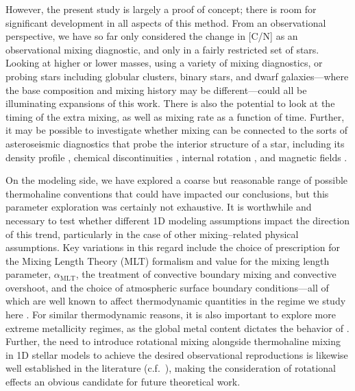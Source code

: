 However, the present study is largely a proof of concept;
there is room for significant development in all aspects of this method. From an observational perspective, we have so far only considered the change in [C/N] as an observational mixing diagnostic, and only in a fairly restricted set of stars. Looking at higher or lower masses, using a variety of mixing diagnostics, or probing stars including globular clusters, binary stars, and dwarf galaxies---where the base composition and mixing history may be different---could all be illuminating expansions of this work. There is also the potential to look at the timing of the extra mixing, as well as mixing rate as a function of time. Further, it may be possible to investigate whether mixing can be connected to the sorts of asteroseismic diagnostics that probe the interior structure of a star, including its density profile \citep{KjeldsenBedding1995}, chemical discontinuities \citep{Verma2017}, internal rotation \citep{Gehan2018}, and magnetic fields \citep{Bugnet2021}. 

On the modeling side, we have explored a coarse but reasonable range of possible thermohaline conventions that could have impacted our conclusions, but this parameter exploration was certainly not exhaustive. It is worthwhile and necessary to test whether different 1D modeling assumptions impact the direction of this trend, particularly in the case of other mixing--related physical assumptions. Key variations in this regard include the choice of prescription for the Mixing Length Theory (MLT) formalism and value for the mixing length parameter, $\alpha_{\text{MLT}}$, the treatment of convective boundary mixing and convective overshoot, and the choice of atmospheric surface boundary conditions---all of which are well known to affect thermodynamic quantities in the regime we study here \citep{tayar2017, Joyce2018a, Joyce2018b, viani2018}. For similar thermodynamic reasons, it is also important to explore more extreme metallicity regimes, as the global metal content dictates the behavior of \gradmu.
%
Further, the need to introduce rotational mixing alongside thermohaline mixing in 1D stellar models to achieve the desired observational reproductions is likewise well established in the literature (c.f.~\citealt{CharbonnelLagarde2010}), making the consideration of rotational effects an obvious candidate for future theoretical work.

